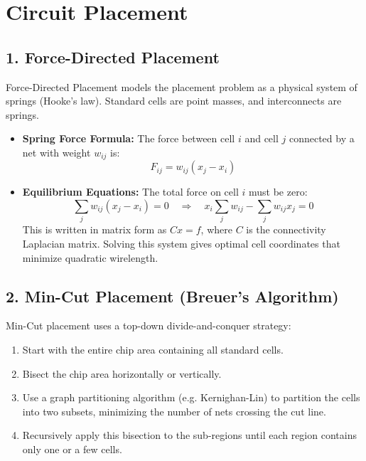 \documentclass[12pt,a4paper]{article}
\begin{document}
\section{Circuit Placement}

\subsection{1. Force-Directed Placement}
Force-Directed Placement models the placement problem as a physical system of springs (Hooke's law). Standard cells are point masses, and interconnects are springs.
\begin{itemize}[leftmargin=*, itemsep=2pt]
  \item \textbf{Spring Force Formula:} The force between cell $i$ and cell $j$ connected by a net with weight $w_{ij}$ is:
        \begin{equation}
          F_{ij} = w_{ij} (x_j - x_i)
        \end{equation}
  \item \textbf{Equilibrium Equations:} The total force on cell $i$ must be zero:
        \begin{equation}
          \sum_{j} w_{ij} (x_j - x_i) = 0 \quad \Rightarrow \quad x_i \sum_{j} w_{ij} - \sum_{j} w_{ij} x_j = 0
        \end{equation}
        This is written in matrix form as $C x = f$, where $C$ is the connectivity Laplacian matrix. Solving this system gives optimal cell coordinates that minimize quadratic wirelength.
\end{itemize}

\subsection{2. Min-Cut Placement (Breuer's Algorithm)}
Min-Cut placement uses a top-down divide-and-conquer strategy:
\begin{enumerate}[leftmargin=*, itemsep=2pt]
  \item Start with the entire chip area containing all standard cells.
  \item Bisect the chip area horizontally or vertically.
  \item Use a graph partitioning algorithm (e.g. Kernighan-Lin) to partition the cells into two subsets, minimizing the number of nets crossing the cut line.
  \item Recursively apply this bisection to the sub-regions until each region contains only one or a few cells.
\end{enumerate}
\end{document}
